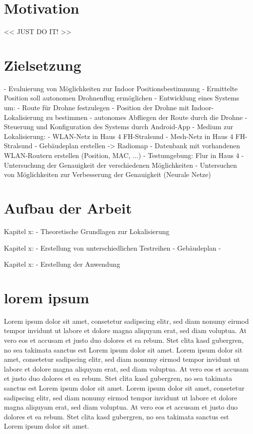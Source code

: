 
\section{Motivation}\label{motivation}
<< JUST DO IT! >>

\section{Zielsetzung}\label{Zielsetzung}
- Evaluierung von Möglichkeiten zur Indoor Positionsbestimmung
- Ermittelte Position soll autonomen Drohnenflug ermöglichen
- Entwicklung eines Systems um:
    - Route für Drohne festzulegen
    - Position der Drohne mit Indoor- Lokalisierung zu bestimmen
    - autonomes Abfliegen der Route durch die Drohne
    - Steuerung und Konfiguration des Systems durch Android-App
- Medium zur Lokalisierung:
    - WLAN-Netz in Haus 4 FH-Stralsund
    - Mesh-Netz in Haus 4 FH-Stralsund
- Gebäudeplan erstellen -> Radiomap
- Datenbank mit vorhandenen WLAN-Routern erstellen (Position, MAC, ...)
- Testumgebung: Flur in Haus 4
- Untersuchung der Genauigkeit der verschiedenen Möglichkeiten
- Untersuchen von Möglichkeiten zur Verbesserung der Genauigkeit (Neurale Netze)

\section{Aufbau der Arbeit}\label{Aufbau der Arbeit}
Kapitel x:
    - Theoretische Grundlagen zur Lokalisierung

Kapitel x:
    - Erstellung von unterschiedlichen Testreihen
    - Gebäudeplan
    -

Kapitel x:
    - Erstellung der Anwendung

\section{lorem ipsum}
Lorem ipsum dolor sit amet, consetetur sadipscing elitr, sed diam nonumy eirmod tempor invidunt ut labore et dolore magna aliquyam erat, sed diam voluptua. At vero eos et accusam et justo duo dolores et ea rebum. Stet clita kasd gubergren, no sea takimata sanctus est Lorem ipsum dolor sit amet. Lorem ipsum dolor sit amet, consetetur sadipscing elitr, sed diam nonumy eirmod tempor invidunt ut labore et dolore magna aliquyam erat, sed diam voluptua. At vero eos et accusam et justo duo dolores et ea rebum. Stet clita kasd gubergren, no sea takimata sanctus est Lorem ipsum dolor sit amet. Lorem ipsum dolor sit amet, consetetur sadipscing elitr, sed diam nonumy eirmod tempor invidunt ut labore et dolore magna aliquyam erat, sed diam voluptua. At vero eos et accusam et justo duo dolores et ea rebum. Stet clita kasd gubergren, no sea takimata sanctus est Lorem ipsum dolor sit amet.   

